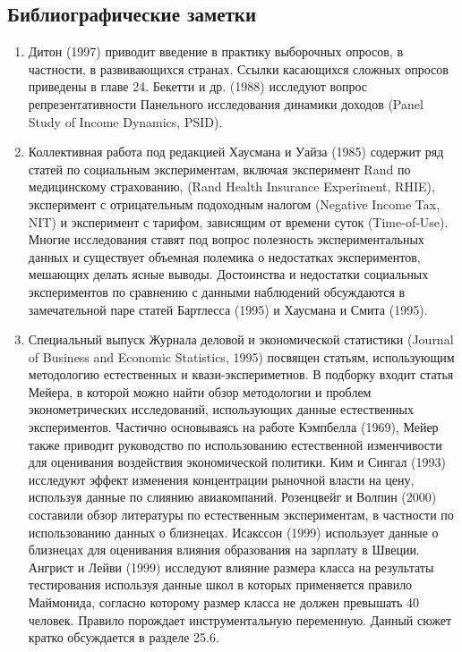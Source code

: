 \subsection{Библиографические заметки}

\begin{enumerate}
\item Дитон (1997) приводит введение в практику выборочных опросов, в частности, в развивающихся странах. Ссылки касающихся сложных опросов приведены в главе 24. Бекетти и др. (1988) исследуют вопрос репрезентативности Панельного исследования динамики доходов (Panel Study of Income Dynamics, PSID).
\item Коллективная работа под редакцией Хаусмана и Уайза (1985) содержит ряд статей по социальным экспериментам, включая эксперимент Rand по медицинскому страхованию, (Rand Health Insurance Experiment, RHIE), эксперимент с отрицательным подоходным налогом (Negative Income Tax, NIT) и эксперимент с тарифом, зависящим от времени суток (Time-of-Use).
Многие исследования ставят под вопрос полезность экспериментальных данных и существует объемная полемика о недостатках экспериментов, мешающих делать ясные выводы. Достоинства и недостатки социальных экспериментов по сравнению с данными наблюдений обсуждаются в замечательной паре статей Бартлесса (1995) и Хаусмана и Смита (1995).
\item Специальный выпуск Журнала деловой и экономической статистики (Journal of Business and Economic Statistics, 1995) посвящен статьям, использующим методологию естественных и квази-экспериметнов. В подборку входит статья Мейера, в которой можно найти обзор методологии и проблем эконометрических исследований, использующих данные естественных экспериментов. Частично основываясь на работе Кэмпбелла (1969), Мейер также приводит руководство по использованию естественной изменчивости для оценивания воздействия экономической политики. 
Ким и Сингал (1993) исследуют эффект изменения концентрации рыночной власти на цену, используя данные по слиянию авиакомпаний. Розенцвейг и Волпин (2000) составили обзор литературы по естественным экспериментам, в частности по использованию данных о близнецах. Исакссон (1999) использует данные о близнецах для оценивания влияния образования на зарплату в Швеции. Ангрист и Лейви (1999) исследуют влияние размера класса на результаты тестирования используя данные школ в которых применяется правило Маймонида, согласно которому размер класса не должен превышать 40 человек.  Правило порождает инструментальную переменную. Данный сюжет кратко обсуждается в разделе 25.6.



\end{enumerate}

